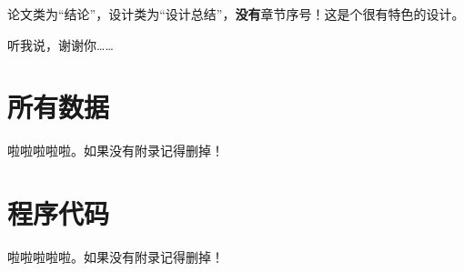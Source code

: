 \documentclass{thesis-cqjtu}
\begin{document}
论文类为“结\qquad{}论”，设计类为“设计总结”，\textbf{没有}章节序号！这是个很有特色的设计。

听我说，谢谢你……

{
    \linespread{1.2} \selectfont    %
    
    
}

\appendix
\section{所有数据}

啦啦啦啦啦。如果没有附录记得删掉！

\section{程序代码}

啦啦啦啦啦。如果没有附录记得删掉！
\end{document}

